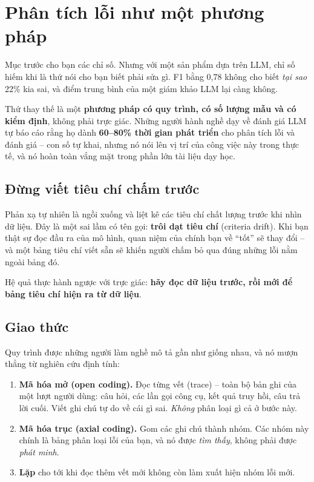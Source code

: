 
\section{Phân tích lỗi như một phương pháp}
\label{sec:error_analysis}

Mục trước cho bạn các chỉ số. Nhưng với một sản phẩm dựa trên LLM, chỉ số hiếm khi là thứ nói cho bạn biết phải sửa gì. F1 bằng 0{,}78 không cho biết \emph{tại sao} 22\% kia sai, và điểm trung bình của một giám khảo LLM lại càng không.

Thứ thay thế là một \textbf{phương pháp có quy trình, có số lượng mẫu và có kiểm định}, không phải trực giác. Những người hành nghề dạy về đánh giá LLM tự báo cáo rằng họ dành \textbf{60--80\% thời gian phát triển} cho phân tích lỗi và đánh giá -- con số tự khai, nhưng nó nói lên vị trí của công việc này trong thực tế, và nó hoàn toàn vắng mặt trong phần lớn tài liệu dạy học.

\subsection{Đừng viết tiêu chí chấm trước}
\label{ssec:no_rubric_first}

Phản xạ tự nhiên là ngồi xuống và liệt kê các tiêu chí chất lượng trước khi nhìn dữ liệu. Đây là một sai lầm có tên gọi: \textbf{trôi dạt tiêu chí} (criteria drift). Khi bạn thật sự đọc đầu ra của mô hình, quan niệm của chính bạn về “tốt” sẽ thay đổi -- và một bảng tiêu chí viết sẵn sẽ khiến người chấm bỏ qua đúng những lỗi nằm ngoài bảng đó.

Hệ quả thực hành ngược với trực giác: \textbf{hãy đọc dữ liệu trước, rồi mới để bảng tiêu chí hiện ra từ dữ liệu}.

\subsection{Giao thức}
\label{ssec:error_protocol}

Quy trình được những người làm nghề mô tả gần như giống nhau, và nó mượn thẳng từ nghiên cứu định tính:

\begin{enumerate}
	\item \textbf{Mã hóa mở (open coding).} Đọc từng vết (trace) -- toàn bộ bản ghi của một lượt người dùng: câu hỏi, các lần gọi công cụ, kết quả truy hồi, câu trả lời cuối. Viết ghi chú tự do về cái gì sai. \emph{Không} phân loại gì cả ở bước này.
	\item \textbf{Mã hóa trục (axial coding).} Gom các ghi chú thành nhóm. Các nhóm này chính là bảng phân loại lỗi của bạn, và nó được \emph{tìm thấy}, không phải được \emph{phát minh}.
	\item \textbf{Lặp} cho tới khi đọc thêm vết mới không còn làm xuất hiện nhóm lỗi mới.
\end{enumerate}

